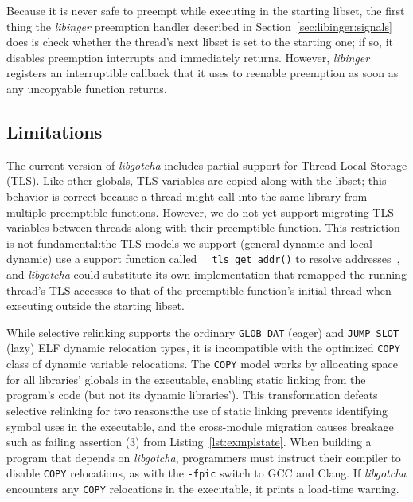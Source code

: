 Because it is never safe to preempt while executing in the starting libset, the
first thing the \textit{libinger} preemption handler described in
Section~\ref{sec:libinger:signals} does is check whether the thread's next libset
is set to the starting one; if so, it disables preemption interrupts and immediately
returns.  However, \textit{libinger} registers an interruptible callback that it uses
to reenable preemption as soon as any uncopyable function returns.



\subsection{Limitations}
\label{sec:limits}

The current version of \textit{libgotcha} includes partial support for Thread-Local
Storage (TLS).  Like other globals, TLS variables are copied along with the libset;
this behavior is correct because a thread might call into the same library from
multiple preemptible functions.  However, we do not yet support migrating TLS
variables between threads along with their preemptible function.  This restriction is
not fundamental:\@ the TLS models we support (general dynamic and local dynamic) use
a support function called \texttt{\_\_tls\_get\_addr()} to resolve
addresses~\cite{drepper:spec2013}, and \textit{libgotcha} could substitute its own
implementation that remapped the running thread's TLS accesses to that of the
preemptible function's initial thread when executing outside the starting libset.

While selective relinking supports the ordinary \texttt{GLOB\_DAT} (eager) and
\texttt{JUMP\_SLOT} (lazy) ELF dynamic relocation types, it is incompatible with the
optimized \texttt{COPY} class of dynamic variable relocations.  The \texttt{COPY}
model works by allocating space for all libraries' globals in the executable,
enabling static linking from the program's code (but not its dynamic libraries').
This transformation defeats selective relinking for two reasons:\@ the use of static
linking prevents identifying symbol uses in the executable, and the cross-module
migration causes breakage such as failing assertion (3) from
Listing~\ref{lst:exmplstate}.  When building a program that depends on
\textit{libgotcha}, programmers must instruct their compiler to disable \texttt{COPY}
relocations, as with the \texttt{-fpic} switch to GCC and Clang.  If
\textit{libgotcha} encounters any \texttt{COPY} relocations in the executable, it
prints a load-time warning.


